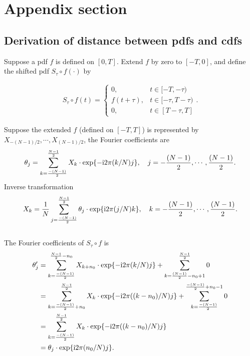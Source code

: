 
\appendix

\section{Appendix section}\label{app}

\subsection{Derivation of distance between pdfs and cdfs}
Suppose a pdf $f$ is defined on $[0,T]$.
Extend $f$ by zero to $[-T,0]$, and define the shifted pdf $S_\tau \circ f(\cdot)$ by 

\begin{align}\label{eq:def of shifted curve}
	S_\tau\circ f(t)=
	\begin{cases}
	0, &t\in[-T,-\tau)\\
	f(t+ \tau), &t\in[-\tau,T-\tau)\\
	0,& t\in [T-\tau,T]
	\end{cases}.
\end{align}

Suppose the extended $f$ (defined on $[-T,T]$) is represented by $X_{-(N-1)/2},\cdots,X_{(N-1)/2}$, the Fourier coefficients are
\begin{align*}
	\theta_j = \sum_{k=\frac{-(N-1)}{2}}^{\frac{N-1}{2}} X_k \cdot \exp\{-\complexunit{}2\pi ({k}/{N})j\} , \quad j=-\frac{(N-1)}{2}, \cdots, \frac{(N-1)}{2}.
\end{align*}
Inverse transformation
\begin{align*}
X_k = \frac{1}{N} \sum_{j=\frac{-(N-1)}{2}}^{\frac{N-1}{2}} \theta_j \cdot \exp\{\complexunit{}2\pi ({j}/{N})k\} , \quad k=-\frac{(N-1)}{2}, \cdots, \frac{(N-1)}{2}.
\end{align*}
\\
The Fourier coefficients of $S_\tau \circ f$ is
\begin{align*}
	\theta_j' 
	&= \sum_{k=\frac{-(N-1)}{2}}^{\frac{N-1}{2}-n_0} X_{k+n_0} \cdot \exp\{-\complexunit{}2\pi ({k}/{N})j\} + 
	\sum_{k=\frac{(N-1)}{2}-n_0+1}^{\frac{N-1}{2}} 0 \\
	&= \sum_{k=\frac{-(N-1)}{2}+n_0}^{\frac{N-1}{2}} X_{k} 
	\cdot \exp\{-\complexunit{}2\pi ({(k-n_0)}/{N})j\} 
	+ \sum_{k=\frac{-(N-1)}{2}}^{\frac{-(N-1)}{2}+n_0-1} 0 \\
	&= \sum_{k=\frac{-(N-1)}{2}}^{\frac{N-1}{2}} X_{k} \cdot 
	\exp\{-\complexunit{}2\pi ({(k-n_0)}/{N})j\} \\
	&= \theta_j \cdot \exp \{ \complexunit{}2\pi (n_0/N)j \}.
\end{align*}

